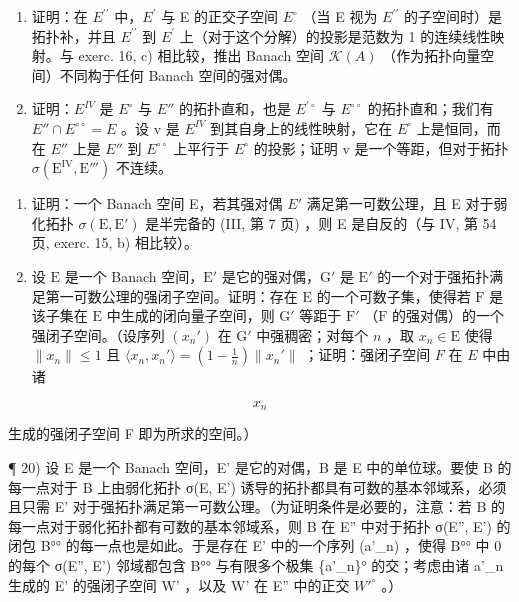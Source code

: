 \begin{enumerate}
\def\labelenumi{\alph{enumi})}
\item
  证明：在 \(E^{\prime\prime}\) 中，\(E^{\prime}\) 与 E 的正交子空间 \(E^{\circ}\) （当 E 视为 \(E^{\prime\prime}\) 的子空间时）是拓扑补，并且 \(E^{\prime\prime}\) 到 \(E^{\prime}\) 上（对于这个分解）的投影是范数为 1 的连续线性映射。与 exerc. 16, c) 相比较，推出 Banach 空间 \(\mathcal{K}(A)\) （作为拓扑向量空间）不同构于任何 Banach 空间的强对偶。
\item
  证明：\(E^{IV}\) 是 \(E^{\circ}\) 与 \(E''\) 的拓扑直和，也是 \(E^{\prime\circ}\) 与 \(E^{\circ\circ}\) 的拓扑直和；我们有 \(E'' \cap E^{\circ\circ} = E\) 。设 v 是 \(E^{IV}\) 到其自身上的线性映射，它在 \(E^{\circ}\) 上是恒同，而在 \(E''\) 上是 \(E''\) 到 \(E^{\circ\circ}\) 上平行于 \(E^{\circ}\) 的投影；证明 v 是一个等距，但对于拓扑 \(\sigma(\mathrm{E}^{\mathrm{IV}}, \mathrm{E}''')\) 不连续。
\end{enumerate}

\begin{enumerate}
\def\labelenumi{\arabic{enumi})}
\setcounter{enumi}{17}
\item
  证明：一个 Banach 空间 E，若其强对偶 \(E'\) 满足第一可数公理，且 E 对于弱化拓扑 \(\sigma(\mathrm{E}, \mathrm{E}')\) 是半完备的 (III, 第 7 页) ，则 E 是自反的（与 IV, 第 54 页, exerc. 15, b) 相比较）。
\item
  设 \(\mathrm{E}\) 是一个 Banach 空间，\(\mathrm{E}'\) 是它的强对偶，\(\mathrm{G}'\) 是 \(\mathrm{E}'\) 的一个对于强拓扑满足第一可数公理的强闭子空间。证明：存在 \(\mathrm{E}\) 的一个可数子集，使得若 \(\mathrm{F}\) 是该子集在 \(\mathrm{E}\) 中生成的闭向量子空间，则 \(\mathrm{G}'\) 等距于 \(\mathrm{F}'\) （\(\mathrm{F}\) 的强对偶）的一个强闭子空间。（设序列 \((x_n')\) 在 \(\mathrm{G}'\) 中强稠密；对每个 \(n\) ，取 \(x_n \in \mathrm{E}\) 使得 \(\| x_n \| \leqslant 1\) 且 \(\langle x_n, x_n' \rangle = \left(1 - \frac{1}{n}\right) \| x_n' \|\) ；证明：强闭子空间 \(F\) 在 \(E\) 中由诸
\end{enumerate}

\[
x _ {n}
\]

生成的强闭子空间 F 即为所求的空间。）

¶ 20) 设 E 是一个 Banach 空间，E' 是它的对偶，B 是 E 中的单位球。要使 B 的每一点对于 B 上由弱化拓扑 σ(E, E') 诱导的拓扑都具有可数的基本邻域系，必须且只需 E' 对于强拓扑满足第一可数公理。（为证明条件是必要的，注意：若 B 的每一点对于弱化拓扑都有可数的基本邻域系，则 B 在 E'' 中对于拓扑 σ(E'', E') 的闭包 B°° 的每一点也是如此。于是存在 E' 中的一个序列 (a'\_n) ，使得 B°° 中 0 的每个 σ(E'', E') 邻域都包含 B°° 与有限多个极集 \{a'\_n\}° 的交；考虑由诸 a'\_n 生成的 E' 的强闭子空间 W' ，以及 W' 在 E'' 中的正交 \(W'^{\circ}\) 。）

